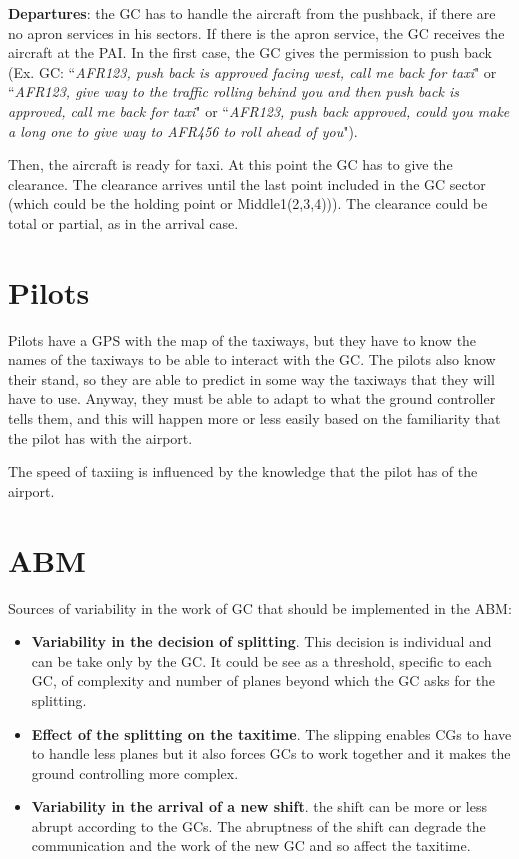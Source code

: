 \documentclass{article}
\begin{document}
\textbf{Departures}: the GC has to handle the aircraft from the pushback, if there are no apron services in his sectors. If there is the apron service, the GC receives the aircraft at the PAI. 
In the first case, the GC gives the permission to push back (Ex. GC: ``\textit{AFR123, push back is approved facing west, call me back for taxi}" or ``\textit{AFR123, give way to the traffic rolling behind you and then push back is approved, call me back for taxi}" or ``\textit{AFR123, push back approved, could you make a long one to give way to AFR456 to roll ahead of you}"). 

Then, the aircraft is ready for taxi. At this point the GC has to give the clearance. The clearance arrives until the last point included in the GC sector (which could be the holding point or Middle1(2,3,4))). The clearance could be total or partial, as in the arrival case.




\section{Pilots}
Pilots have a GPS with the map of the taxiways, but they have to know the names of the taxiways to be able to interact with the GC. The pilots also know their stand, so they are able to predict in some way the taxiways that they will have to use. Anyway, they must be able to adapt to what the ground controller tells them, and this will happen more or less easily based on the familiarity that the pilot has with the airport.

The speed of taxiing is influenced by the knowledge that the pilot has of the airport.

\section{ABM}
Sources of variability in the work of GC that should be implemented in the ABM:
\begin{itemize}
	\item \textbf{Variability in the decision of splitting}. This decision is individual and can be take only by the GC. It could be see as a threshold, specific to each GC, of complexity and number of planes beyond which the GC asks for the splitting.
	\item \textbf{Effect of the splitting on the taxitime}. The slipping enables CGs to have to handle less planes but it also forces GCs to work together and it makes the ground controlling more complex.
	\item \textbf{Variability in the arrival of a new shift}. the shift can be more or less abrupt according to the GCs. The abruptness of the shift can degrade the communication and the work of the new GC and so affect the taxitime.
\end{itemize}
\end{document}
